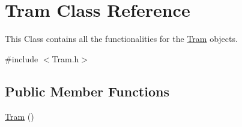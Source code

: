 \hypertarget{classTram}{}\section{Tram Class Reference}
\label{classTram}


This Class contains all the functionalities for the \hyperlink{classTram}{Tram} objects.  




{\ttfamily \#include $<$Tram.\+h$>$}

\subsection*{Public Member Functions}
\begin{DoxyCompactItemize}
\item 
\hyperlink{classTram_aad83b2e7e79d57528691bf317ab0e1ef}{Tram} ()\hypertarget{classTram_aad83b2e7e79d57528691bf317ab0e1ef}{}\label{classTram_aad83b2e7e79d57528691bf317ab0e1ef}


\end{DoxyCompactItemize}
